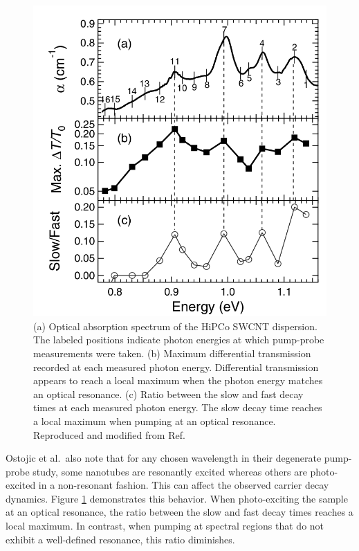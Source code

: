 \begin{figure}[ht]
	\centering
	\includegraphics[scale=0.3]{images/chapter_prior_works/wavelength_dependence_gordana}
	\caption{(a) Optical absorption spectrum of the HiPCo SWCNT dispersion. The labeled positions indicate photon energies at which pump-probe measurements were taken. (b) Maximum differential transmission recorded at each measured photon energy. Differential transmission appears to reach a local maximum when the photon energy matches an optical resonance. (c) Ratio between the slow and fast decay times at each measured photon energy. The slow decay time reaches a local maximum when pumping at an optical resonance. Reproduced and modified from Ref.\ \cite{ostojic2004interband}}
	\label{fig:wl_dep_gordana}
\end{figure}

Ostojic et al.\  also note that for any chosen wavelength in their degenerate pump-probe study, some nanotubes are resonantly excited whereas others are photo-excited in a non-resonant fashion. This can affect the observed carrier decay dynamics. Figure \ref{fig:wl_dep_gordana} demonstrates this behavior. When photo-exciting the sample at an optical resonance, the ratio between the slow and fast decay times reaches a local maximum. In contrast, when pumping at spectral regions that do not exhibit a well-defined resonance, this ratio diminishes.

